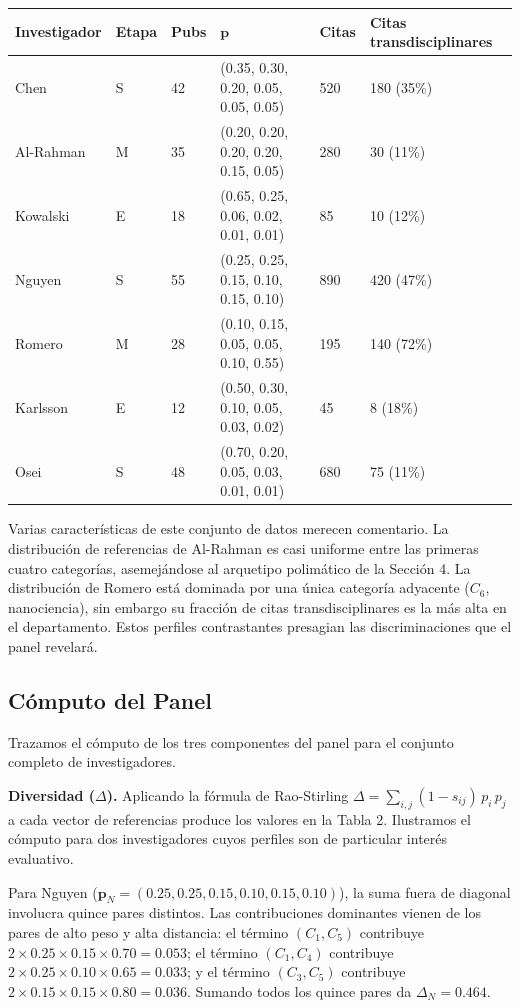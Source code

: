 \documentclass[
]{article}
\begin{document}
\begin{longtable}[]{@{}llllll@{}}
\toprule
Investigador & Etapa & Pubs & \(\mathbf{p}\) & Citas & Citas
transdisciplinares \\
\midrule
\endhead
Chen & S & 42 & (0.35, 0.30, 0.20, 0.05, 0.05, 0.05) & 520 & 180
(35\%) \\
Al-Rahman & M & 35 & (0.20, 0.20, 0.20, 0.20, 0.15, 0.05) & 280 & 30
(11\%) \\
Kowalski & E & 18 & (0.65, 0.25, 0.06, 0.02, 0.01, 0.01) & 85 & 10
(12\%) \\
Nguyen & S & 55 & (0.25, 0.25, 0.15, 0.10, 0.15, 0.10) & 890 & 420
(47\%) \\
Romero & M & 28 & (0.10, 0.15, 0.05, 0.05, 0.10, 0.55) & 195 & 140
(72\%) \\
Karlsson & E & 12 & (0.50, 0.30, 0.10, 0.05, 0.03, 0.02) & 45 & 8
(18\%) \\
Osei & S & 48 & (0.70, 0.20, 0.05, 0.03, 0.01, 0.01) & 680 & 75
(11\%) \\
\bottomrule
\end{longtable}

Varias características de este conjunto de datos merecen comentario. La
distribución de referencias de Al-Rahman es casi uniforme entre las
primeras cuatro categorías, asemejándose al arquetipo polimático de la
Sección 4. La distribución de Romero está dominada por una única
categoría adyacente (\(C_6\), nanociencia), sin embargo su fracción de
citas transdisciplinares es la más alta en el departamento. Estos
perfiles contrastantes presagian las discriminaciones que el panel
revelará.

\hypertarget{cuxf3mputo-del-panel}{%
\subsection{Cómputo del Panel}\label{cuxf3mputo-del-panel}}

Trazamos el cómputo de los tres componentes del panel para el conjunto
completo de investigadores.

\textbf{Diversidad (\(\Delta\)).} Aplicando la fórmula de Rao-Stirling
\(\Delta = \sum_{i,j} (1 - s_{ij})\, p_i\, p_j\) a cada vector de
referencias produce los valores en la Tabla 2. Ilustramos el cómputo
para dos investigadores cuyos perfiles son de particular interés
evaluativo.

Para Nguyen (\(\mathbf{p}_N = (0.25, 0.25, 0.15, 0.10, 0.15, 0.10)\)),
la suma fuera de diagonal involucra quince pares distintos. Las
contribuciones dominantes vienen de los pares de alto peso y alta
distancia: el término \((C_1, C_5)\) contribuye
\(2 \times 0.25 \times 0.15 \times 0.70 = 0.053\); el término
\((C_1, C_4)\) contribuye
\(2 \times 0.25 \times 0.10 \times 0.65 = 0.033\); y el término
\((C_3, C_5)\) contribuye
\(2 \times 0.15 \times 0.15 \times 0.80 = 0.036\). Sumando todos los
quince pares da \(\Delta_N = 0.464\).
\end{document}
